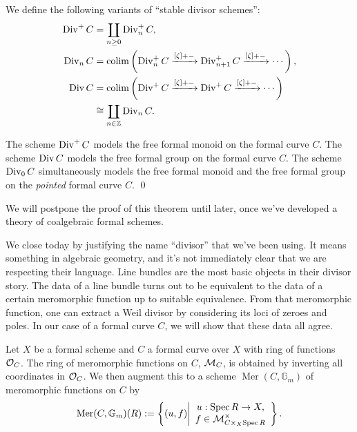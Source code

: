 \begin{definition}
We define the following variants of ``stable divisor schemes'':
\begin{align*}
\operatorname{Div}^+ C & = \coprod_{n \ge 0} \operatorname{Div}_n^+ C, \\
\operatorname{Div}_n C & = \operatorname{colim} \left( \operatorname{Div}_n^+ C \xrightarrow{[\zeta] + -} \operatorname{Div}_{n+1}^+ C \xrightarrow{[\zeta] + -} \cdots \right), \\
\operatorname{Div} C & = \operatorname{colim} \left( \operatorname{Div}^+ C \xrightarrow{[\zeta] + -} \operatorname{Div}^+ C \xrightarrow{[\zeta] + -} \cdots \right) \\
& \cong \coprod_{n \in \mathbb Z} \operatorname{Div}_n C.
\end{align*}
\end{definition}

\begin{theorem}
The scheme $\operatorname{Div}^+ C$ models the free formal monoid on the formal curve $C$.  The scheme $\operatorname{Div} C$ models the free formal group on the formal curve $C$.  The scheme $\operatorname{Div}_0 C$ simultaneously models the free formal monoid and the free formal group on the \emph{pointed} formal curve $C$. \qed {}
\end{theorem}
\noindent We will postpone the proof of this theorem until later, once we've developed a theory of coalgebraic formal schemes.

We close today by justifying the name ``divisor'' that we've been using.  It means something in algebraic geometry, and it's not immediately clear that we are respecting their language.  Line bundles are the most basic objects in their divisor story.  The data of a line bundle turns out to be equivalent to the data of a certain meromorphic function up to suitable equivalence.  From that meromorphic function, one can extract a Weil divisor by considering its loci of zeroes and poles.  In our case of a formal curve $C$, we will show that these data all agree.

\begin{definition}
Let $X$ be a formal scheme and $C$ a formal curve over $X$ with ring of functions $\mathcal{O}_C$.  The ring of meromorphic functions on $C$, $\mathcal{M}_C$, is obtained by inverting all coordinates in $\mathcal{O}_C$.  We then augment this to a scheme $\operatorname{Mer}(C, \mathbb G_m)$ of meromorphic functions on $C$ by \[\operatorname{Mer}(C, \mathbb G_m)(R) := \left\{ (u, f) \middle| \begin{array}{c} u: \operatorname{Spec} R \to X, \\ f \in \mathcal{M}^\times_{C \times_X \operatorname{Spec} R} \end{array} \right\}.\]
\end{definition}

